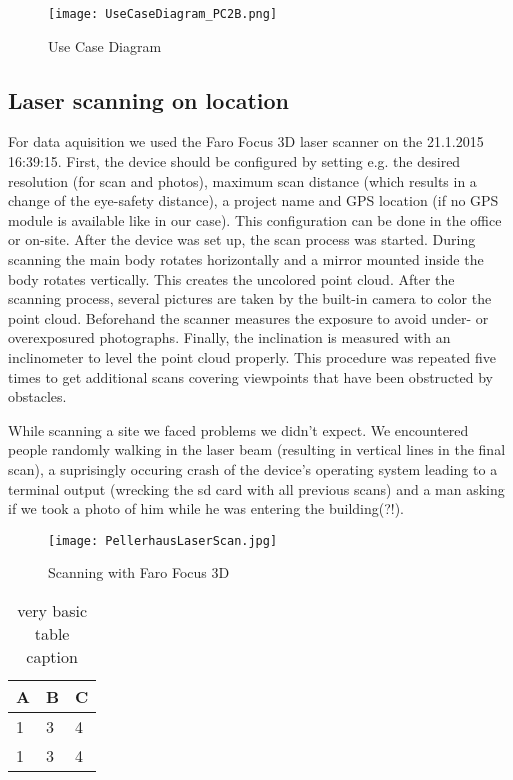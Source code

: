 \begin{figure}[h]
	\centering
	\texttt{[image: UseCaseDiagram\_PC2B.png]}
	\caption{Use Case Diagram}
	\label{fig:use_case}
\end{figure}


\subsection{Laser scanning on location}

For data aquisition we used the Faro Focus 3D laser scanner on the 21.1.2015 16:39:15. First, the device should be configured by setting e.g. the desired resolution (for scan and photos), maximum scan distance (which results in a change of the eye-safety distance), a project name and GPS location (if no GPS module is available like in our case). This configuration can be done in the office or on-site. After the device was set up, the scan process was started. During scanning the main body rotates horizontally and a mirror mounted inside the body rotates vertically. This creates the uncolored point cloud. After the scanning process, several pictures are taken by the built-in camera to color the point cloud. Beforehand the scanner measures the exposure to avoid under- or overexposured photographs. Finally, the inclination is measured with an inclinometer to level the point cloud properly.
This procedure was repeated five times to get additional scans covering viewpoints that have been obstructed by obstacles.

While scanning a site we faced problems we didn't expect. We encountered people randomly walking in the laser beam (resulting in vertical lines in the final scan), a suprisingly occuring crash of the device's operating system leading to a terminal output (wrecking the sd card with all previous scans) and a man asking if we took a photo of him while he was entering the building(?!).


\begin{figure}[h]
	\centering
	\texttt{[image: PellerhausLaserScan.jpg]}
	\caption{Scanning with Faro Focus 3D}
	\label{fig:laser_scanning_on_location}
\end{figure}



\begin{table}[h]
	\centering
	\begin{tabular}{l | l | l}
		A & B & C \\
		\hline
		1 & 3 & 4 \\
		1 & 3 & 4 \\
	\end{tabular}
	\caption{very basic table caption}
	\label{tab:abc}
\end{table}

